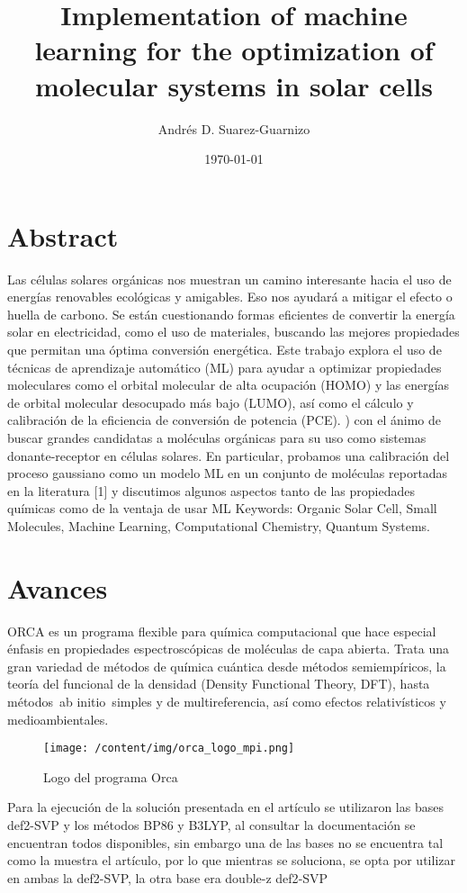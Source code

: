 \documentclass{article}%
\title{Implementation of machine learning for the optimization of molecular systems in solar cells}%
\author{Andrés D. Suarez{-}Guarnizo}%
\date{\today}%
\begin{document}
%
\normalsize%
\maketitle%
\section{Abstract}%
\label{sec:Abstract}%
Las células solares orgánicas nos muestran un camino interesante hacia el uso de energías renovables ecológicas y amigables. Eso nos ayudará a mitigar el efecto o huella de carbono. Se están cuestionando formas eficientes de convertir la energía solar en electricidad, como el uso de materiales, buscando las mejores propiedades que permitan una óptima conversión energética. Este trabajo explora el uso de técnicas de aprendizaje automático (ML) para ayudar a optimizar propiedades moleculares como el orbital molecular de alta ocupación (HOMO) y las energías de orbital molecular desocupado más bajo (LUMO), así como el cálculo y calibración de la eficiencia de conversión de potencia (PCE). ) con el ánimo de buscar grandes candidatas a moléculas orgánicas para su uso como sistemas donante{-}receptor en células solares. En particular, probamos una calibración del proceso gaussiano como un modelo ML en un conjunto de moléculas reportadas en la literatura {[}1{]} y discutimos algunos aspectos tanto de las propiedades químicas como de la ventaja de usar ML%
Keywords: Organic Solar Cell, Small Molecules, Machine Learning, Computational Chemistry, Quantum Systems.

%
\section{Avances}%
\label{sec:Avances}%
ORCA es un programa flexible para química computacional que hace especial énfasis en propiedades espectroscópicas de moléculas de capa abierta. Trata una gran variedad de métodos de química cuántica desde métodos semiempíricos, la teoría del funcional de la densidad (Density Functional Theory, DFT), hasta métodos~ab initio~simples y de multireferencia, así como efectos relativísticos y medioambientales.%


\begin{figure}[H]%
\centering%
\texttt{[image: /content/img/orca\_logo\_mpi.png]}%
\caption{Logo del programa Orca}%
\end{figure}

%
Para la ejecución de la solución presentada en el artículo se utilizaron las bases def2{-}SVP y los métodos BP86 y B3LYP, al consultar la documentación se encuentran todos disponibles, sin embargo una de las bases no se encuentra tal como la muestra el artículo, por lo que mientras se soluciona, se opta por utilizar en ambas la def2{-}SVP, la otra base era double{-}z def2{-}SVP%
\end{document}
